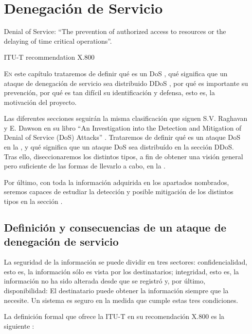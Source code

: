 \chapter{Denegación de Servicio}
\pagestyle{esitscCD}
\epigraph{ Denial of Service: ``The prevention of authorized access to resources or the delaying of time critical 
operations''. }{ITU-T recommendation X.800}

\lettrine[lraise=-0.1, lines=2, loversize=0.25]{E}n este capítulo trataremos de definir qué es un \gls{DoS} 
, qué significa que un ataque de denegación de servicio sea distribuido \acrshort{DDoS} , por 
qué es importante su prevención, por qué es tan difícil su identificación y defensa, esto es, la motivación del 
proyecto.

Las diferentes secciones seguirán la misma clasificación que siguen S.V. Raghavan y E. Dawson en su libro ``An 
Investigation into the Detection and Mitigation of Denial of Service (DoS) Attacks'' \cite{Raghavan}. Trataremos de 
definir qué es un ataque \gls{DoS} en la , y qué significa que un ataque \gls{DoS} sea 
distribuído en la sección \gls{DDoS}. Tras ello, diseccionaremos los distintos tipos, a fin de obtener una visión 
general pero suficiente de las formas de llevarlo a cabo, en la .

Por último, con toda la información adquirida en los apartados nombrados, seremos capaces de estudiar la detección y 
posible mitigación de los distintos tipos en la sección .

\section{Definición y consecuencias de un ataque de denegación de servicio} 
La seguridad de la información se puede dividir en tres sectores: confidencialidad, esto es, la 
información sólo es vista por los destinatarios; integridad, esto es, la información no ha sido 
alterada desde que se registró y, por último, disponibilidad: El destinatario puede obtener la 
información siempre que la necesite. Un sistema es seguro en la medida que cumple estas tres 
condiciones.

La definición formal que ofrece la \gls{ITU-T} en su recomendación X.800 es la siguiente \cite{ITU-T_DDoS_def}:

